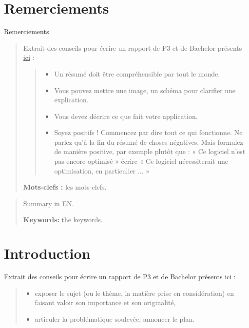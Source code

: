 \chapter*{Remerciements}
Remerciements

\begin{abstract}
Extrait des conseils pour écrire un rapport de P3 et de Bachelor présents \href{https://gitlab-etu.ing.he-arc.ch/isc/documentation/projet-p3-et-bachelor/-/wikis/help-report}{ici} :
\begin{quote}    
  \begin{itemize}   
    \item Un résumé doit être compréhensible par tout le monde.
    \item Vous pouvez mettre une image, un schéma pour clarifier une explication.
    \item Vous devez décrire ce que fait votre application.
    \item Soyez positifs ! Commencez par dire tout ce qui fonctionne. Ne parlez qu’à la fin du résumé de choses négatives. Mais formulez de manière positive, par exemple plutôt que : « Ce logiciel n’est pas encore optimisé » écrire « Ce logiciel nécessiterait une optimisation, en particulier ... »  
  \end{itemize}
\end{quote}

\textbf{Mots-clefs :} les mots-clefs.
\end{abstract}

\renewcommand{\abstractname}{Abstract}
\begin{abstract}
Summary in EN.


\textbf{Keywords:} the keywords.
\end{abstract}

\setcounter{tocdepth}{6}
\setcounter{secnumdepth}{6}
\tableofcontents

\clearpage
{} %

\chapter{Introduction}
Extrait des conseils pour écrire un rapport de P3 et de Bachelor présents \href{https://gitlab-etu.ing.he-arc.ch/isc/documentation/projet-p3-et-bachelor/-/wikis/help-report}{ici} :
\begin{quote}    
  \begin{itemize}   
    \item exposer le sujet (ou le thème, la matière prise en considération) en faisant valoir son importance et son originalité,
    \item articuler la problématique soulevée,
    annoncer le plan.
  \end{itemize}
\end{quote}

